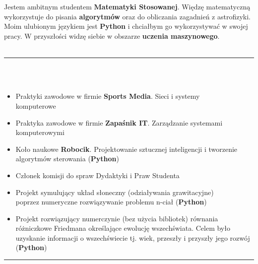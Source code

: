 \documentclass[10pt]{article}
\begin{document}
    \begin{minipage}[t]{0.60\textwidth}
        \fontsize{10pt}{10pt} \\ \\
        Jestem ambitnym studentem \textbf{Matematyki Stosowanej}. Więdzę matematyczną wykorzystuje do pisania \textbf{algorytmów} oraz do obliczania zagadnień z astrofizyki.
        Moim ulubionym językiem jest \textbf{Python} i chciałbym go wykorzystywać w swojej pracy. W przyszłości widzę siebie w obszarze \textbf{uczenia maszynowego}. \\ \\
        \rule{11cm}{1pt} \\ \\
        \fontsize{10pt}{10pt}
        \begin{itemize}[leftmargin=*]
            \setlength{\parskip}{0pt}
            \item Praktyki zawodowe w firmie \textbf{Sports Media}. Sieci i systemy \\ komputerowe
            \item Praktyka zawodowe w firmie \textbf{Zapaśnik IT}. Zarządzanie systemami  \\komputerowymi
            \item Koło naukowe \textbf{Robocik}. Projektowanie sztucznej inteligencji i tworzenie algorytmów sterowania (\textbf{Python})
            \item Członek komisji do spraw Dydaktyki i Praw Studenta
            \item Projekt symulujący układ słoneczny (odziaływania grawitacyjne) \\ poprzez numeryczne rozwiązywanie problemu n-ciał  (\textbf{Python})
            \item Projekt rozwiązujący numerczynie (bez użycia bibliotek) równania różniczkowe Friedmana określające ewolucję wszechświata.
            Celem było uzyskanie informacji o wszechświecie tj. wiek, przeszły i przyszły jego rozwój (\textbf{Python})
        \end{itemize}
        \rule{11cm}{1pt} \\ \\
        \fontsize{10pt}{10pt}
        \begin{itemize}[leftmargin=*]
            \setlength{\parskip}{0pt}

\end{itemize}
\end{minipage}
\end{document}
